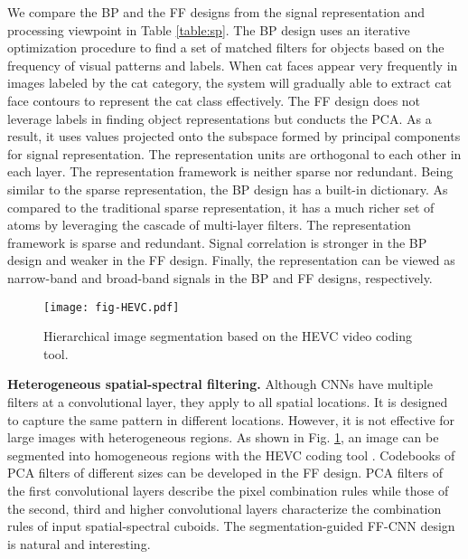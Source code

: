 \documentclass[preprint,12pt]{elsarticle}
\begin{document}
We compare the BP and the FF designs from the signal representation and
processing viewpoint in Table \ref{table:sp}. The BP design uses an
iterative optimization procedure to find a set of matched filters for
objects based on the frequency of visual patterns and labels. When cat
faces appear very frequently in images labeled by the cat category, the
system will gradually able to extract cat face contours to represent the
cat class effectively. The FF design does not leverage labels in finding
object representations but conducts the PCA. As a result, it uses values
projected onto the subspace formed by principal components for signal
representation. The representation units are orthogonal to each other in
each layer.  The representation framework is neither sparse nor
redundant.  Being similar to the sparse representation, the BP design
has a built-in dictionary.  As compared to the traditional sparse
representation, it has a much richer set of atoms by leveraging the
cascade of multi-layer filters.  The representation framework is sparse
and redundant. Signal correlation is stronger in the BP design and
weaker in the FF design. Finally, the representation can be viewed as
narrow-band and broad-band signals in the BP and FF designs,
respectively. 

\begin{figure}[htb]
\centering
\texttt{[image: fig-HEVC.pdf]}
\caption{Hierarchical image segmentation based on the HEVC 
video coding tool.}\label{fig:HEVC}
\end{figure}

{\bf Heterogeneous spatial-spectral filtering.} Although CNNs have
multiple filters at a convolutional layer, they apply to all spatial
locations. It is designed to capture the same pattern in different
locations. However, it is not effective for large images with
heterogeneous regions. As shown in Fig.  \ref{fig:HEVC}, an image can be
segmented into homogeneous regions with the HEVC coding tool
\cite{sullivan2012overview}.  Codebooks of PCA filters of different
sizes can be developed in the FF design.  PCA filters of the first
convolutional layers describe the pixel combination rules while those of
the second, third and higher convolutional layers characterize the
combination rules of input spatial-spectral cuboids.  The
segmentation-guided FF-CNN design is natural and interesting. 
\end{document}
